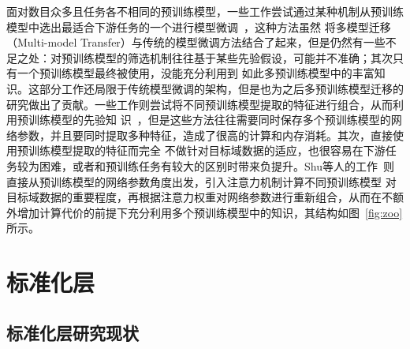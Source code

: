 面对数目众多且任务各不相同的预训练模型，一些工作尝试通过某种机制从预训练模型中选出最适合下游任务的一个进行模型微调~\citep{tran2019transferability,bao2019information,you2021logme}，这种方法虽然
将多模型迁移（Multi-model Transfer）与传统的模型微调方法结合了起来，但是仍然有一些不足之处：对预训练模型的筛选机制往往基于某些先验假设，可能并不准确；其次只有一个预训练模型最终被使用，没能充分利用到
如此多预训练模型中的丰富知识。这部分工作还局限于传统模型微调的架构，但是也为之后多预训练模型迁移的研究做出了贡献。一些工作则尝试将不同预训练模型提取的特征进行组合，从而利用预训练模型的先验知
识~\citep{rusu2016progressive,liu2019knowledge}，但是这些方法往往需要同时保存多个预训练模型的网络参数，并且要同时提取多种特征，造成了很高的计算和内存消耗。其次，直接使用预训练模型提取的特征而完全
不做针对目标域数据的适应，也很容易在下游任务较为困难，或者和预训练任务有较大的区别时带来负提升。Shu等人的工作~\citep{shu2021zoo}则直接从预训练模型的网络参数角度出发，引入注意力机制计算不同预训练模型
对目标域数据的重要程度，再根据注意力权重对网络参数进行重新组合，从而在不额外增加计算代价的前提下充分利用多个预训练模型中的知识，其结构如图~\ref{fig:zoo}所示。

\section{标准化层}

\subsection{标准化层研究现状}

